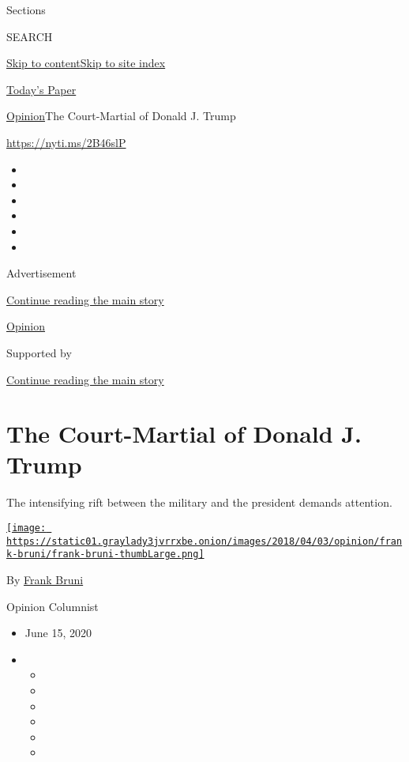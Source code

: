Sections

SEARCH

\protect\hyperlink{site-content}{Skip to
content}\protect\hyperlink{site-index}{Skip to site index}

\href{https://myaccount.nytimes3xbfgragh.onion/auth/login?response_type=cookie\&client_id=vi}{}

\href{https://www.nytimes3xbfgragh.onion/section/todayspaper}{Today's
Paper}

\href{/section/opinion}{Opinion}\textbar{}The Court-Martial of Donald J.
Trump

\href{https://nyti.ms/2B46slP}{https://nyti.ms/2B46slP}

\begin{itemize}
\item
\item
\item
\item
\item
\item
\end{itemize}

Advertisement

\protect\hyperlink{after-top}{Continue reading the main story}

\href{/section/opinion}{Opinion}

Supported by

\protect\hyperlink{after-sponsor}{Continue reading the main story}

\hypertarget{the-court-martial-of-donald-j-trump}{%
\section{The Court-Martial of Donald J.
Trump}\label{the-court-martial-of-donald-j-trump}}

The intensifying rift between the military and the president demands
attention.

\href{https://www.nytimes3xbfgragh.onion/by/frank-bruni}{\texttt{[image: https://static01.graylady3jvrrxbe.onion/images/2018/04/03/opinion/frank-bruni/frank-bruni-thumbLarge.png]}}

By \href{https://www.nytimes3xbfgragh.onion/by/frank-bruni}{Frank Bruni}

Opinion Columnist

\begin{itemize}
\item
  June 15, 2020
\item
  \begin{itemize}
  \item
  \item
  \item
  \item
  \item
  \item
  \end{itemize}
\end{itemize}

